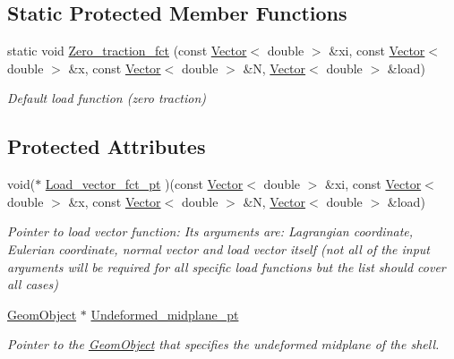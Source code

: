\subsection*{Static Protected Member Functions}
\begin{DoxyCompactItemize}
\item 
static void \hyperlink{classoomph_1_1KirchhoffLoveShellEquations_a13cfb1791eee82943ca56fef1a4f9dbe}{Zero\+\_\+traction\+\_\+fct} (const \hyperlink{classoomph_1_1Vector}{Vector}$<$ double $>$ \&xi, const \hyperlink{classoomph_1_1Vector}{Vector}$<$ double $>$ \&x, const \hyperlink{classoomph_1_1Vector}{Vector}$<$ double $>$ \&N, \hyperlink{classoomph_1_1Vector}{Vector}$<$ double $>$ \&load)
\begin{DoxyCompactList}\small\item\em Default load function (zero traction) \end{DoxyCompactList}\end{DoxyCompactItemize}
\subsection*{Protected Attributes}
\begin{DoxyCompactItemize}
\item 
void($\ast$ \hyperlink{classoomph_1_1KirchhoffLoveShellEquations_a9f4a216ad08e35795d0a3a6080fb9ce0}{Load\+\_\+vector\+\_\+fct\+\_\+pt} )(const \hyperlink{classoomph_1_1Vector}{Vector}$<$ double $>$ \&xi, const \hyperlink{classoomph_1_1Vector}{Vector}$<$ double $>$ \&x, const \hyperlink{classoomph_1_1Vector}{Vector}$<$ double $>$ \&N, \hyperlink{classoomph_1_1Vector}{Vector}$<$ double $>$ \&load)
\begin{DoxyCompactList}\small\item\em Pointer to load vector function\+: Its arguments are\+: Lagrangian coordinate, Eulerian coordinate, normal vector and load vector itself (not all of the input arguments will be required for all specific load functions but the list should cover all cases) \end{DoxyCompactList}\item 
\hyperlink{classoomph_1_1GeomObject}{Geom\+Object} $\ast$ \hyperlink{classoomph_1_1KirchhoffLoveShellEquations_aec919dec7bab41fe5f7012ae8ebc8411}{Undeformed\+\_\+midplane\+\_\+pt}
\begin{DoxyCompactList}\small\item\em Pointer to the \hyperlink{classoomph_1_1GeomObject}{Geom\+Object} that specifies the undeformed midplane of the shell. \end{DoxyCompactList}\end{DoxyCompactItemize}
